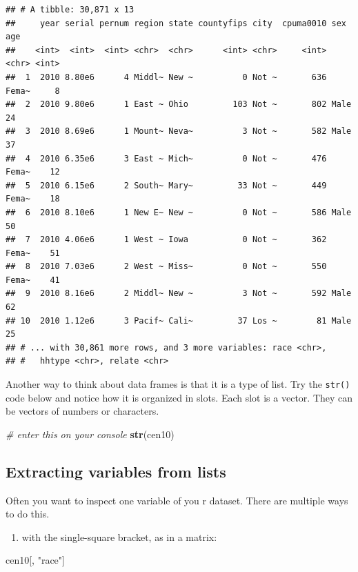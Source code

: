 \documentclass[]{book}
\newenvironment{Shaded}{\begin{snugshade}}{\end{snugshade}}
\newcommand{\KeywordTok}[1]{\textcolor[rgb]{0.13,0.29,0.53}{\textbf{#1}}}
\newcommand{\StringTok}[1]{\textcolor[rgb]{0.31,0.60,0.02}{#1}}
\newcommand{\CommentTok}[1]{\textcolor[rgb]{0.56,0.35,0.01}{\textit{#1}}}
\newcommand{\NormalTok}[1]{#1}
\providecommand{\tightlist}{%
  \setlength{\itemsep}{0pt}\setlength{\parskip}{0pt}}
\theoremstyle{definition}
\theoremstyle{definition}
\theoremstyle{definition}
\theoremstyle{remark}
\begin{document}
\begin{verbatim}
## # A tibble: 30,871 x 13
##     year serial pernum region state countyfips city  cpuma0010 sex     age
##    <int>  <int>  <int> <chr>  <chr>      <int> <chr>     <int> <chr> <int>
##  1  2010 8.80e6      4 Middl~ New ~          0 Not ~       636 Fema~     8
##  2  2010 9.80e6      1 East ~ Ohio         103 Not ~       802 Male     24
##  3  2010 8.69e6      1 Mount~ Neva~          3 Not ~       582 Male     37
##  4  2010 6.35e6      3 East ~ Mich~          0 Not ~       476 Fema~    12
##  5  2010 6.15e6      2 South~ Mary~         33 Not ~       449 Fema~    18
##  6  2010 8.10e6      1 New E~ New ~          0 Not ~       586 Male     50
##  7  2010 4.06e6      1 West ~ Iowa           0 Not ~       362 Fema~    51
##  8  2010 7.03e6      2 West ~ Miss~          0 Not ~       550 Fema~    41
##  9  2010 8.16e6      2 Middl~ New ~          3 Not ~       592 Male     62
## 10  2010 1.12e6      3 Pacif~ Cali~         37 Los ~        81 Male     25
## # ... with 30,861 more rows, and 3 more variables: race <chr>,
## #   hhtype <chr>, relate <chr>
\end{verbatim}

Another way to think about data frames is that it is a type of list. Try
the \texttt{str()} code below and notice how it is organized in slots.
Each slot is a vector. They can be vectors of numbers or characters.

\begin{Shaded}
\begin{Highlighting}[]
\CommentTok{# enter this on your console}
\KeywordTok{str}\NormalTok{(cen10)}
\end{Highlighting}
\end{Shaded}

\subsection{Extracting variables from
lists}\label{extracting-variables-from-lists}

Often you want to inspect one variable of you r dataset. There are
multiple ways to do this.

\begin{enumerate}
\def\labelenumi{\arabic{enumi}.}
\tightlist
\item
  with the single-square bracket, as in a matrix:
\end{enumerate}

\begin{Shaded}
\begin{Highlighting}[]
\NormalTok{cen10[, }\StringTok{"race"}\NormalTok{]}
\end{Highlighting}
\end{Shaded}
\end{document}
